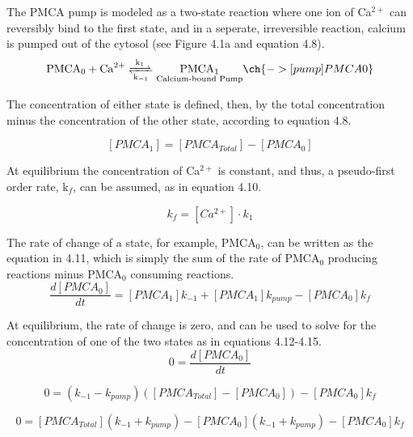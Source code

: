 \documentclass[12pt]{ucsddissertation}
\begin{document}
The PMCA pump is modeled as a two-state reaction where one ion of Ca$^{2+}$ can reversibly bind to the first state, and in a seperate, irreversible reaction, calcium is pumped out of the cytosol (see Figure 4.1a and equation 4.8). 
\begin{equation}
\ce{PMCA0 + Ca^2+  <=>[\ce{k_{1}}][\ce{k_{-1}}]
$\underset{\text{Calcium-bound Pump}}{\ce{PMCA1}}$
} \ch{ ->[pump] PMCA0}
\end{equation}

The concentration of either state is defined, then, by the total concentration minus the concentration of the other state, according to equation 4.8.

\begin{equation}
\left[PMCA_{1}\right] =\left[PMCA_{Total}\right] - \left[PMCA_{0}\right]
\end{equation}

At equilibrium the concentration of Ca$^{2+}$ is constant, and thus, a pseudo-first order rate, k$_{f}$, can be assumed, as in equation 4.10. 

\begin{equation}
k_{f} = [Ca^{2+}] \cdot k_{1}
\end{equation}

The rate of change of a state, for example, PMCA$_{0}$, can be written as the equation in 4.11, which is simply the sum of the rate of PMCA$_{0}$ producing reactions minus PMCA$_{0}$ consuming reactions.
\begin{equation}
\frac{d\left[PMCA_{0}\right]}{dt} = \left[PMCA_{1}\right]k_{-1} + \left[PMCA_{1}\right] k_{pump} - \left[PMCA_{0}\right] k_{f}
\end{equation}

At equilibrium, the rate of change is zero, and can be used to solve for the concentration of one of the two states as in equations 4.12-4.15.
\begin{equation}
0 = \frac{d\left[PMCA_{0}\right]}{dt}
\end{equation}

\begin{equation}
0 = (k_{-1}-k_{pump}) (\left[PMCA_{Total}\right] - \left[PMCA_{0}\right])- \left[PMCA_{0}\right] k_{f}
\end{equation}

\begin{equation}
0 = \left[PMCA_{Total}\right] (k_{-1} + k_{pump}) - \left[PMCA_{0}\right](k_{-1} + k_{pump}) - \left[PMCA_{0}\right] k_{f}
\end{equation}
\end{document}
